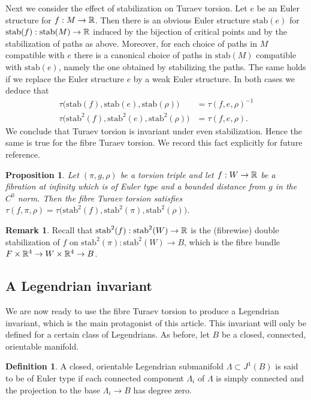 \documentclass[11pt]{article}
\numberwithin{equation}{section}\providecommand{\dpl}{\displaystyle}
\newcommand{\stab}{\mathrm{stab}}
\theoremstyle{plain}
\newtheorem{proposition}[theorem]{Proposition}
\theoremstyle{definition}
\newtheorem{definition}[theorem]{Definition}
\newtheorem{remark}[theorem]{Remark}
\begin{document}
Next we consider the effect of stabilization on Turaev torsion. Let $e$ be an Euler structure for $f:M \to \mathbb{R}$. Then there is an obvious Euler structure $\stab (e)$ for $\stab (f) : \stab (M) \to \bR$ induced by the bijection of critical points and by the stabilization of paths as above. Moreover, for each choice of paths in $M$ compatible with $e$ there is a canonical choice of paths in $\stab (M)$ compatible with $\stab (e)$, namely the one obtained by stabilizing the paths. The same holds if we replace the Euler structure $e$ by a weak Euler structure. In both cases we deduce that
\begin{align*}
\tau\big(\stab (f), \stab (e), \stab (\rho) \big) &= \tau(f,e,\rho)^{-1} \\ \tag*{and} \tau\big(\stab ^2(f), \stab ^2(e), \stab ^2(\rho) \big) &= \tau(f,e, \rho).
\end{align*}
We conclude that Turaev torsion is invariant under even stabilization. Hence the same is true for the fibre Turaev torsion. We record this fact explicitly for future reference.

\begin{proposition}\label{Proposition: turaev stability} Let $(\pi,g,\rho)$ be a torsion triple and let $f:W \to \mathbb{R}$ be a fibration at infinity which is of Euler type and a bounded distance from $g$ in the $C^0$ norm. Then the fibre Turaev torsion satisfies $\tau(f, \pi, \rho) = \tau\big( \stab ^2(f), \stab ^2(\pi), \stab ^2(\rho) \big)$.
\end{proposition}

\begin{remark} Recall that $\stab ^2(f) : \stab ^2(W) \to \bR$ is the (fibrewise) double stabilization of $f$ on $\stab ^2(\pi):\stab ^2(W) \to B$, which is the fibre bundle $F \times \mathbb{R}^4 \to W \times \mathbb{R}^4 \to B$. \end{remark}

\subsection{A Legendrian invariant}\label{sec: invariant}

We are now ready to use the fibre Turaev torsion to produce a Legendrian invariant, which is the main protagonist of this article. This invariant will only be defined for a certain class of Legendrians. As before, let $B$ be a closed, connected, orientable manifold.

\begin{definition}
A closed, orientable Legendrian submanifold $\Lambda \subset J^1(B)$ is said to be of Euler type if each connected component $\Lambda_i$ of $\Lambda$ is simply connected and the projection to the base $\Lambda_i \to B$ has degree zero. \end{definition}
\end{document}
